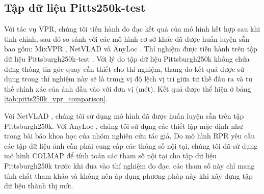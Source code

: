 
\subsection*{Tập dữ liệu Pitts250k-test}
Với tác vụ VPR, chúng tôi tiến hành đo đạc kết quả của mô hình kết hợp sau khi tinh chỉnh, sau đó so sánh với các mô hình cơ sở khác đã được huấn luyện sẵn bao gồm: MixVPR \cite{alibey2023mixvpr}, NetVLAD \cite{arandjelovic2016netvlad} và AnyLoc \cite{keetha2023anyloc}. Thí nghiệm được tiến hành trên tập dữ liệu Pittsburgh250k-test \cite{6618963}. Với lý do tập dữ liệu Pittsburgh250k không chứa đựng thông tin góc quay cần thiết cho thí nghiệm, thang đo kết quả được sử dụng trong thí nghiệm này sẽ là trung vị độ lệch vị trí giữa tư thế đầu ra và tư thế chính xác của ảnh đầu vào với đơn vị (mét). Kết quả được thể hiện ở bảng \ref{tab:pitts250k_vpr_comparison}.

Với NetVLAD \cite{arandjelovic2016netvlad}, chúng tôi sử dụng mô hình đã được huấn luyện sẵn trên tập Pittsburgh250k. Với AnyLoc \cite{keetha2023anyloc}, chúng tôi sử dụng các thiết lập mặc định như trong bài báo khoa học của nhóm nghiên cứu tác giả. Do mô hình RPR yêu cầu các tập dữ liệu ảnh cần phải cung cấp các thông số nội tại, chúng tôi đã sử dụng mô hình COLMAP\cite{schoenberger2016sfm} để tính toán các tham số nội tại cho tập dữ liệu Pittsburgh250k trước khi đưa vào thí nghiệm đo đạc, các tham số này chỉ mang tính chất tham khảo và không nên áp dụng phương pháp này khi xây dựng tập dữ liệu thành thị mới.

